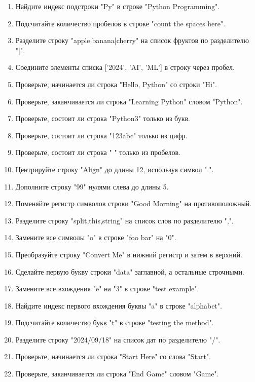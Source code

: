\documentclass[a4,12pt]{article}
\theoremstyle{remark}
\begin{document}
\begin{enumerate}
    \item Найдите индекс подстроки "Py" в строке "Python Programming".
    \item Подсчитайте количество пробелов в строке "count the spaces here".
    \item Разделите строку "apple|banana|cherry" на список фруктов по разделителю "|".
    \item Соедините элементы списка ['2024', 'AI', 'ML'] в строку через пробел.
    \item Проверьте, начинается ли строка "Hello, Python" со строки "Hi".
    \item Проверьте, заканчивается ли строка "Learning Python" словом "Python".
    \item Проверьте, состоит ли строка "Python3" только из букв.
    \item Проверьте, состоит ли строка "123abc" только из цифр.
    \item Проверьте, состоит ли строка " " только из пробелов.
    \item Центрируйте строку "Align" до длины 12, используя символ ".".
    \item Дополните строку "99" нулями слева до длины 5.
    \item Поменяйте регистр символов строки "Good Morning" на противоположный.
    \item Разделите строку "split,this,string" на список слов по разделителю ",".
    \item Замените все символы "o" в строке "foo bar" на "0".
    \item Преобразуйте строку "Convert Me" в нижний регистр и затем в верхний.
    \item Сделайте первую букву строки "data" заглавной, а остальные строчными.
    \item Замените все вхождения "e" на "3" в строке "test example".
    \item Найдите индекс первого вхождения буквы "a" в строке "alphabet".
    \item Подсчитайте количество букв "t" в строке "testing the method".
    \item Разделите строку "2024/09/18" на список дат по разделителю "/".
    \item Проверьте, начинается ли строка "Start Here" со слова "Start".
    \item Проверьте, заканчивается ли строка "End Game" словом "Game".

\end{enumerate}
\end{document}

